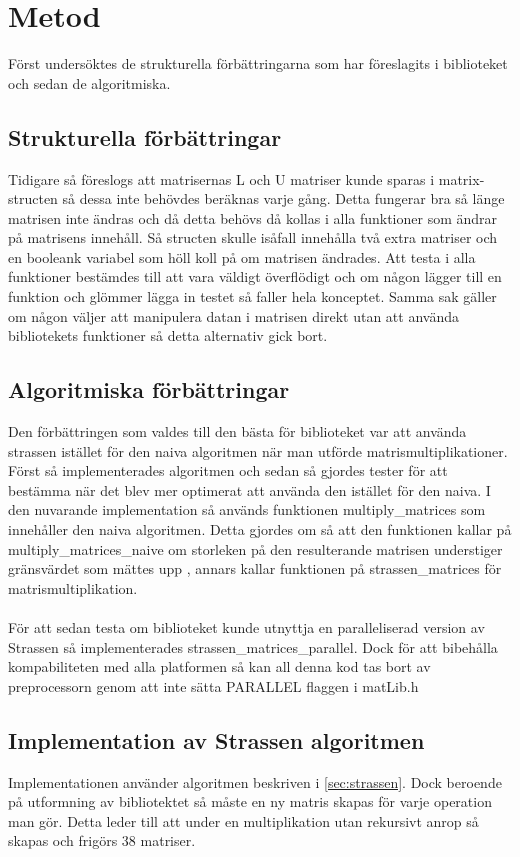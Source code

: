 \section{Metod}
Först undersöktes de strukturella förbättringarna som har föreslagits i biblioteket och sedan de algoritmiska.
\subsection{Strukturella förbättringar}
Tidigare så föreslogs att matrisernas L och U matriser kunde sparas i matrix-structen så dessa inte behövdes beräknas varje gång. Detta fungerar bra så länge matrisen inte ändras och då detta behövs då kollas i alla funktioner som ändrar på matrisens innehåll. Så structen skulle isåfall innehålla två extra matriser och en booleank variabel som höll koll på om matrisen ändrades. Att testa i alla funktioner bestämdes till att vara väldigt överflödigt och om någon lägger till en funktion och glömmer lägga in testet så faller hela konceptet. Samma sak gäller om någon väljer att manipulera datan i matrisen direkt utan att använda bibliotekets funktioner så detta alternativ gick bort.

\subsection{Algoritmiska förbättringar}
Den förbättringen som valdes till den bästa för biblioteket var att använda strassen istället för den naiva algoritmen när man utförde matrismultiplikationer. Först så implementerades algoritmen och sedan så gjordes tester för att bestämma när det blev mer optimerat att använda den istället för den naiva. I den nuvarande implementation så används funktionen multiply\_matrices som innehåller den naiva algoritmen. Detta gjordes om så att den funktionen kallar på multiply\_matrices\_naive om storleken på den resulterande matrisen understiger gränsvärdet som mättes upp , annars kallar funktionen på strassen\_matrices för matrismultiplikation. 
\\
\\
För att sedan testa om biblioteket kunde utnyttja en paralleliserad version av Strassen så implementerades  strassen\_matrices\_parallel. Dock för att bibehålla kompabiliteten med alla platformen så kan all denna kod tas bort av preprocessorn genom att inte sätta PARALLEL flaggen i matLib.h
\subsection{Implementation av Strassen algoritmen}
Implementationen använder algoritmen beskriven i \ref{sec:strassen}. Dock beroende på utformning av bibliotektet så måste en ny matris skapas för varje operation man gör. Detta leder till att under en multiplikation utan rekursivt anrop så skapas och frigörs 38 matriser. 

